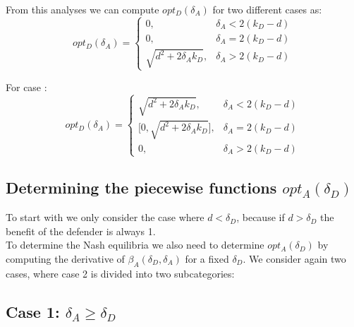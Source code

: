 From this analyses we can compute $opt_{D}(\delta_{A})$ for two different cases as:
 \begin{displaymath}
  opt_{D}(\delta_{A}) = \left\{
     \begin{array}{lr}
       0, & \delta_{A} < 2(k_{D} - d)\\
       0, & \delta_{A} = 2(k_{D} - d) \\
       \sqrt{d^{2} + 2\delta_{A}k_{D}}, & \delta_{A} > 2(k_{D} - d)
     \end{array}
   \right.
\end{displaymath}

For case :
 \begin{displaymath}
  opt_{D}(\delta_{A}) = \left\{
     \begin{array}{lr}
       \sqrt{d^{2} + 2\delta_{A}k_{D}}, & \delta_{A} < 2(k_{D} - d)\\
       \big[0,\sqrt{d^{2} + 2\delta_{A}k_{D}}\big], & \delta_{A} = 2(k_{D} - d) \\
       0, & \delta_{A} > 2(k_{D} - d)
     \end{array}
   \right.
\end{displaymath}


%
%
\subsection{Determining the piecewise functions $opt_{A}(\delta_{D})$}
To start with we only consider the case where $d < \delta_{D}$, because if $d > \delta_{D}$ the benefit of the defender  is always 1. \\
To determine the Nash equilibria we also need to determine $opt_{A}(\delta_{D})$ by computing the derivative of $\beta_{A}(\delta_{D},\delta_{A})$ for a fixed $\delta_{D}$. We consider again two cases, where case 2 is divided into two subcategories: \\

\subsection*{Case 1: $\delta_{A} \geq \delta_{D}$}

